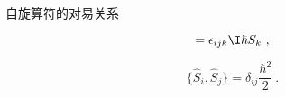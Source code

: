 \begin{theorem}{自旋算符的对易关系}\label{the_ComOpQ_8}



\begin{equation}
[\hat{S}_i, \hat{S}_j]=\epsilon_{ijk}\I\hbar S_k~,
\end{equation}

\begin{equation}
\{\hat{S}_i, \hat{S}_j\}=\delta_{ij}\frac{\hbar^2}{2}~.
\end{equation}


\end{theorem}






